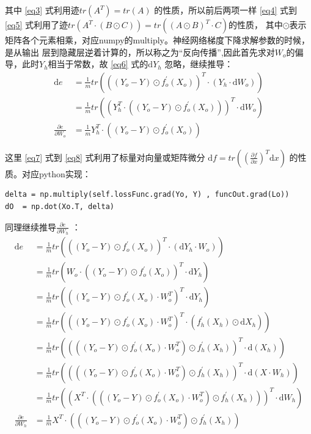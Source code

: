 \documentclass[12pt, a4paper, oneside]{ctexart}
\begin{document}
其中 \eqref{eq3} 式利用迹$tr(A^T) = tr(A)$ 的性质，所以前后两项一样 \eqref{eq4} 式到
\eqref{eq5} 式利用了迹$tr(A^T \cdot (B \odot C)) = tr((A \odot B)^T \cdot C)$的性质，
其中$\odot$表示矩阵各个元素相乘，对应numpy的multiply。神经网络梯度下降求解参数的时候，是从输出
层到隐藏层逆着计算的，所以称之为“反向传播”,因此首先求对$W_o$的偏导，此时$Y_h$相当于常数，故
\eqref{eq6} 式的$\mathrm{d}Y_h$ 忽略，继续推导：
\begin{align}
\mathrm{d}e &= \frac{1}{m}tr(((Y_o - Y) \odot f_o^{'}(X_o))^T \cdot (Y_h \cdot \mathrm{d}W_o))    \nonumber\\
    &= \frac{1}{m}tr((Y_h^T \cdot ((Y_o - Y) \odot f_o^{'}(X_o)))^T \cdot \mathrm{d}W_o)   \label{eq7} \\
    \frac{\partial e}{\partial W_o} &= \frac{1}{m}Y_h^T \cdot ((Y_o - Y) \odot f_o^{'}(X_o))    \label{eq8}
\end{align}

这里 \eqref{eq7} 式到 \eqref{eq8} 式利用了标量对向量或矩阵微分
$\mathrm{d}f = tr((\frac{\partial f}{\partial x})^T \mathrm{d}x)$ 的性质。对应python实现：
\begin{lstlisting}
delta = np.multiply(self.lossFunc.grad(Yo, Y) , funcOut.grad(Lo))
dO  = np.dot(Xo.T, delta)
\end{lstlisting}

同理继续推导$\frac{\partial e}{\partial W_h}$ ：
\begin{align}
\mathrm{d}e &= \frac{1}{m}tr(((Y_o - Y) \odot f_o^{'}(X_o))^T \cdot (\mathrm{d}Y_h \cdot W_o))  \label{eq9} \\
    &= \frac{1}{m}tr(W_o \cdot ((Y_o - Y) \odot f_o^{'}(X_o))^T \cdot \mathrm{d}Y_h ) \nonumber\\
    &= \frac{1}{m}tr(((Y_o - Y) \odot f_o^{'}(X_o) \cdot W_o^T)^T \cdot \mathrm{d}Y_h ) \nonumber\\
    &= \frac{1}{m}tr(((Y_o - Y) \odot f_o^{'}(X_o) \cdot W_o^T)^T \cdot (f_h^{'}(X_h) \odot \mathrm{d}X_h) )  \nonumber\\
    &= \frac{1}{m}tr((((Y_o - Y) \odot f_o^{'}(X_o) \cdot W_o^T) \odot f_h^{'}(X_h))^T \cdot \mathrm{d}(X_h) ) \label{eq10} \\
    &= \frac{1}{m}tr((((Y_o - Y) \odot f_o^{'}(X_o) \cdot W_o^T) \odot f_h^{'}(X_h))^T \cdot \mathrm{d}(X \cdot W_h) ) \nonumber\\
    &= \frac{1}{m}tr((X^T \cdot (((Y_o - Y) \odot f_o^{'}(X_o) \cdot W_o^T) \odot f_h^{'}(X_h)))^T \cdot \mathrm{d}W_h ) \nonumber\\
    \frac{\partial e}{\partial W_h} &= \frac{1}{m}X^T \cdot (((Y_o - Y) \odot f_o^{'}(X_o) \cdot W_o^T) \odot f_h^{'}(X_h))  \label{eq11}
\end{align}
\end{document}
